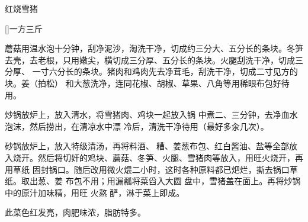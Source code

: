 \begin{recipe}{红烧雪猪}

\ingredients

[\footnotemark]{一方三斤}

\preparation

\step 蘑菇用温水泡十分钟，刮净泥沙，淘洗干净，切成约三分大、五分长的条块。冬笋
去壳，去老根，只用嫩尖，横切成三分厚、五分长的条块。火腿刮洗干净，切成三分厚、
一寸六分长的条块。猪肉和鸡肉先去净茸毛，刮洗干净，切成二寸见方的块。姜（拍松）
和大葱洗净，连同花椒、胡椒、草果、八角等用稀眼布包好待用。

\step 炒锅放炉上，放入清水，将雪猪肉、鸡块一起放入锅 中煮二、三分钟，去净血水
泡沫，然后捞出，在清凉水中漂 冷后，清洗干净待用（最好多汆几次）。

\step 砂锅放炉上，放入特级清汤，再将料酒、𫃑糟、姜葱布包、红白酱油、盐等全部放
入烧开。然后将切奸的鸡块、蘑菇、冬笋、火腿、雪猪肉等放入，用旺火烧开，再用草纸
固封锅口。随后改用微火煨二小时，这时各种原料都已𤆵烂，撕去锅口草纸。取出葱、姜
布包不用；用漏瓢将菜舀入大圆 盘中，雪猪盖在面上。再将炒锅中的原汁加味精，用旺
火熬 酽，淋于菜上即成。

\features

此菜色红发亮，肉肥味浓，脂肪特多。


\end{recipe}

